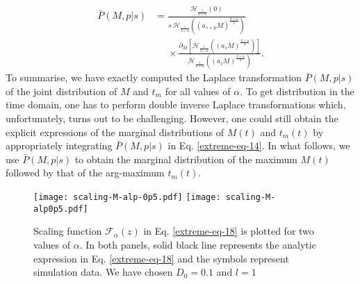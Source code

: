 \documentclass[showpacs,amsmath,amssymb,aps,pre,twocolumn,]{revtex4-1}
\begin{document}
\begin{align}
\bar{P}(M, p|s)&= \frac{  \mathcal{H}_{\frac{1}{2+\alpha}} \left(0 \right) }{s~\mathcal{H}_{\frac{1}{2+\alpha}} \left( (a_{s+p} M)^{\frac{2+\alpha}{2}} \right)}
\nonumber  \\
& ~~~~~~\times \frac{\partial _M \left[ \mathcal{H}_{\frac{1}{2+\alpha}} \left( (a_s M)^{\frac{2+\alpha}{2}} \right) \right]}{ \mathcal{H}_{\frac{1}{2+\alpha}} \left( (a_s M)^{\frac{2+\alpha}{2}} \right) } . \label{extreme-eq-14}
\end{align}
To summarise, we have exactly computed the Laplace transformation $\bar{P}(M, p|s)$ of the joint distribution of $M$ and $t_m$ for all values of $\alpha$. To get distribution in the time domain, one has to perform double inverse Laplace transformations which, unfortunately, turns out to be challenging. However, one could still obtain the explicit expressions of the marginal distributions of $M(t)$ and $t_m(t)$ by appropriately integrating $\bar{P}(M, p|s)$ in Eq. \eqref{extreme-eq-14}. In what follows, we use $\bar{P}(M, p|s)$ to obtain the marginal distribution of the maximum $M(t)$ followed by that of the arg-maximum $t_m(t)$. 
\begin{figure*}[t]
\texttt{[image: scaling-M-alp-0p5.pdf]}
\texttt{[image: scaling-M-alp0p5.pdf]}
\centering
\caption{Scaling function $\mathcal{F}_{\alpha}(z)$ in Eq. \eqref{extreme-eq-18} is plotted for two values of $\alpha$. In both panels, solid black line represents the analytic expression in Eq. \eqref{extreme-eq-18} and the symbols represent simulation data. We have chosen $D_0=0.1$ and $l=1$ }
\label{scaling-M-fig}
\end{figure*}
\end{document}
